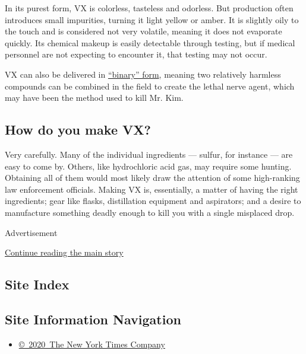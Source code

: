 In its purest form, VX is colorless, tasteless and odorless. But
production often introduces small impurities, turning it light yellow or
amber. It is slightly oily to the touch and is considered not very
volatile, meaning it does not evaporate quickly. Its chemical makeup is
easily detectable through testing, but if medical personnel are not
expecting to encounter it, that testing may not occur.

VX can also be delivered in
\href{https://www.opcw.org/about-chemical-weapons/types-of-chemical-agent/nerve-agents/\#c4114}{``binary''
form}, meaning two relatively harmless compounds can be combined in the
field to create the lethal nerve agent, which may have been the method
used to kill Mr. Kim.

\hypertarget{how-do-you-make-vx}{%
\subsection{How do you make VX?}\label{how-do-you-make-vx}}

Very carefully. Many of the individual ingredients --- sulfur, for
instance --- are easy to come by. Others, like hydrochloric acid gas,
may require some hunting. Obtaining all of them would most likely draw
the attention of some high-ranking law enforcement officials. Making VX
is, essentially, a matter of having the right ingredients; gear like
flasks, distillation equipment and aspirators; and a desire to
manufacture something deadly enough to kill you with a single misplaced
drop.

Advertisement

\protect\hyperlink{after-bottom}{Continue reading the main story}

\hypertarget{site-index}{%
\subsection{Site Index}\label{site-index}}

\hypertarget{site-information-navigation}{%
\subsection{Site Information
Navigation}\label{site-information-navigation}}

\begin{itemize}
\tightlist
\item
  \href{https://help.nytimes3xbfgragh.onion/hc/en-us/articles/115014792127-Copyright-notice}{©~2020~The
  New York Times Company}
\end{itemize}

